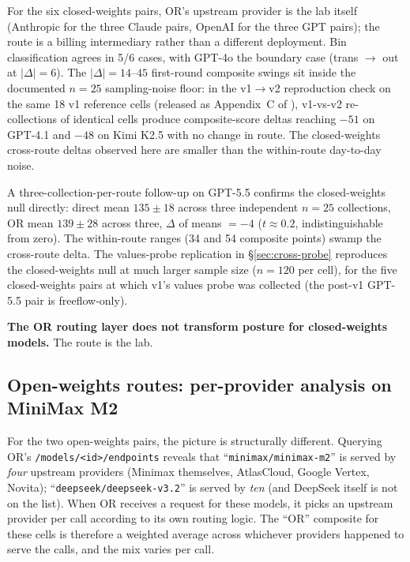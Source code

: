 \documentclass[11pt,a4paper]{article}
\begin{document}
For the six closed-weights pairs, OR's upstream provider is the lab itself (Anthropic for the three Claude pairs, OpenAI for the three GPT pairs); the route is a billing intermediary rather than a different deployment. Bin classification agrees in 5/6 cases, with GPT-4o the boundary case (trans $\rightarrow$ out at $|\Delta|{=}6$). The $|\Delta|{=}14$--$45$ first-round composite swings sit inside the documented $n{=}25$ sampling-noise floor: in the v1$\rightarrow$v2 reproduction check on the same 18 v1 reference cells (released as Appendix~C of \citep{tenner2026drift}), v1-vs-v2 re-collections of identical cells produce composite-score deltas reaching $-51$ on GPT-4.1 and $-48$ on Kimi K2.5 with no change in route. The closed-weights cross-route deltas observed here are smaller than the within-route day-to-day noise.

A three-collection-per-route follow-up on GPT-5.5 confirms the closed-weights null directly: direct mean $135 \pm 18$ across three independent $n{=}25$ collections, OR mean $139 \pm 28$ across three, $\Delta$ of means $= -4$ ($t \approx 0.2$, indistinguishable from zero). The within-route ranges (34 and 54 composite points) swamp the cross-route delta. The values-probe replication in \S\ref{sec:cross-probe} reproduces the closed-weights null at much larger sample size ($n{=}120$ per cell), for the five closed-weights pairs at which v1's values probe was collected (the post-v1 GPT-5.5 pair is freeflow-only).

\textbf{The OR routing layer does not transform posture for closed-weights models.} The route is the lab.

\subsection{Open-weights routes: per-provider analysis on MiniMax M2}
\label{sec:routing-open}

For the two open-weights pairs, the picture is structurally different. Querying OR's \texttt{/models/\allowbreak<id>/\allowbreak endpoints} reveals that ``\texttt{minimax/\allowbreak minimax-m2}'' is served by \emph{four} upstream providers (Minimax themselves, AtlasCloud, Google Vertex, Novita); ``\texttt{deepseek/\allowbreak deepseek-v3.2}'' is served by \emph{ten} (and DeepSeek itself is not on the list). When OR receives a request for these models, it picks an upstream provider per call according to its own routing logic. The ``OR'' composite for these cells is therefore a weighted average across whichever providers happened to serve the calls, and the mix varies per call.
\end{document}
